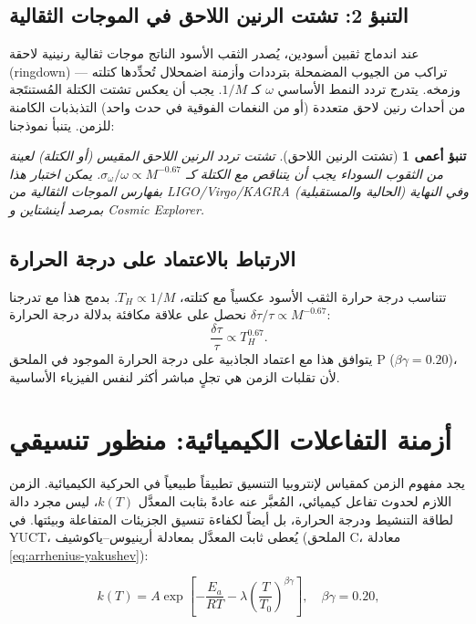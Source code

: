 \documentclass[11pt,a4paper]{article}
\newtheorem{prediction}[theorem]{تنبؤ أعمى}
\begin{document}
	\subsection{التنبؤ 2: تشتت الرنين اللاحق في الموجات الثقالية}
	
	عند اندماج ثقبين أسودين، يُصدر الثقب الأسود الناتج موجات ثقالية رنينية لاحقة (ringdown) — تراكب من الجيوب المضمحلة بترددات وأزمنة اضمحلال تُحدِّدها كتلته وزمخه. يتدرج تردد النمط الأساسي \(\omega\) كـ \(1/M\). يجب أن يعكس تشتت الكتلة المُستنتَجة من أحداث رنين لاحق متعددة (أو من النغمات الفوقية في حدث واحد) التذبذبات الكامنة للزمن. يتنبأ نموذجنا:
	\begin{prediction}[تشتت الرنين اللاحق]
		تشتت تردد الرنين اللاحق المقيس (أو الكتلة) لعينة من الثقوب السوداء يجب أن يتناقص مع الكتلة كـ \(\sigma_{\omega}/\omega \propto M^{-0.67}\). يمكن اختبار هذا بفهارس الموجات الثقالية من LIGO/Virgo/KAGRA (الحالية والمستقبلية) وفي النهاية بمرصد أينشتاين و Cosmic Explorer.
	\end{prediction}
	
	\subsection{الارتباط بالاعتماد على درجة الحرارة}
	
	تتناسب درجة حرارة الثقب الأسود عكسياً مع كتلته، \(T_H \propto 1/M\). بدمج هذا مع تدرجنا \(\delta\tau/\tau \propto M^{-0.67}\) نحصل على علاقة مكافئة بدلالة درجة الحرارة:
	\begin{equation}
		\frac{\delta\tau}{\tau} \propto T_H^{0.67}.
	\end{equation}
	يتوافق هذا مع اعتماد الجاذبية على درجة الحرارة الموجود في الملحق P (\(\beta\gamma = 0.20\))، لأن تقلبات الزمن هي تجلٍ مباشر أكثر لنفس الفيزياء الأساسية.
	
	\section{أزمنة التفاعلات الكيميائية: منظور تنسيقي}
	\label{sec:chemistry}
	
	يجد مفهوم الزمن كمقياس لإنتروبيا التنسيق تطبيقاً طبيعياً في الحركية الكيميائية. الزمن اللازم لحدوث تفاعل كيميائي، المُعبَّر عنه عادةً بثابت المعدَّل \(k(T)\)، ليس مجرد دالة لطاقة التنشيط ودرجة الحرارة، بل أيضاً لكفاءة تنسيق الجزيئات المتفاعلة وبيئتها. في YUCT، يُعطى ثابت المعدَّل بمعادلة أرينيوس–ياكوشيف (الملحق C، معادلة \ref{eq:arrhenius-yakushev}):
	
	\begin{equation}
		k(T) = A \exp\left[-\frac{E_a}{RT} - \lambda \left(\frac{T}{T_0}\right)^{\beta\gamma}\right], \quad \beta\gamma = 0.20,
	\end{equation}
	
\end{document}

